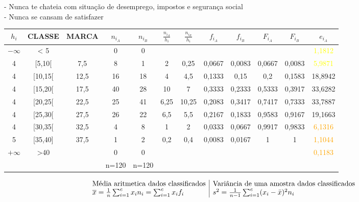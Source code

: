 \hspace*{.5cm} - Nunca te chateia com situação de desemprego, impostos e segurança social\\
\hspace*{.5cm} - Nunca se cansam de satisfazer \\


\begin{minipage}{.75\linewidth}
	\begin{tabular}{ |c|c|c|c|c|c|c|c|c|c|c|c| }
		\hline
		\rowcolor[gray]{0.7}
		$h_i$ & CLASSE & MARCA & $n_{i_A}$ & $n_{i_B}$ & $\frac{n_{i_A}}{h_i}$ & $\frac{n_{i_B}}{h_i}$ & $f_{i_A}$	& $f_{i_B}$ & $F_{i_A}$ & $F_{i_B}$ & $e_{i_A}$ \\
		\hline
		$-\infty$ & < 5 & & 0 & 0 & & & & & & & \textcolor{yellow}{1,1812} \\
		\hline
		4 & [5,10[ & 7,5 & 8 & 1 & 2 & 0,25 & 0,0667 & 0,0083 & 0,0667 & 0,0083 & \textcolor{yellow}{5,9871}\\
		\hline
		4 & [10,15[ & 12,5 & 16 & 18 & 4 & 4,5 & 0,1333 & 0,15 & 0,2 & 0,1583 & 18,8942\\
		\hline
		4 & [15,20[ & 17,5 & 40 & 28 & 10 & 7 & 0,3333 & 0,2333 & 0,5333 & 0,3917 & 33,6282\\
		\hline
		4 & [20,25[ & 22,5 & 25 & 41 & 6,25 & 10,25 & 0,2083 & 0,3417 & 0,7417 & 0,7333 & 33,7887\\
		\hline
		4 & [25,30[ & 27,5 & 26 & 22 & 6,5 & 5,5 & 0,2167 & 0,1833 & 0,9583 & 0,9167 & 19,1663\\
		\hline
		4 & [30,35[ & 32,5 & 4 & 8 & 1 & 2 & 0,0333 & 0,0667 & 0,9917 & 0,9833 & \textcolor{orange}{6,1316}\\
		\hline
		5 & [35,40] & 37,5 & 1 & 2 & 0,2 & 0,4 & 0,0083 & 0,0167 & 1 & 1 & \textcolor{orange}{1,1044}\\
		\hline
		$+\infty$ & >40 & & 0 & 0 & & & & & & & \textcolor{orange}{0,1183}\\
		\hline
		& & & n=120 & n=120 & & & & & & & \\
		\hline
	\end{tabular}
\end{minipage}
\newline
\begin{minipage}{0pt}
	$$\begin{array}{l | l}
		\text{Média aritmetica dados classificados} & \text{Variância de uma amostra dados classificados} \\
		\overline{x} = \frac{1}{n}\sum_{i=1}^cx_in_i = \sum_{i=1}^cx_if_i & s^2 = \frac{1}{n-1}\sum_{i=1}^c (x_i-\bar{x})^2 n_i
	\end{array}$$
\end{minipage}
